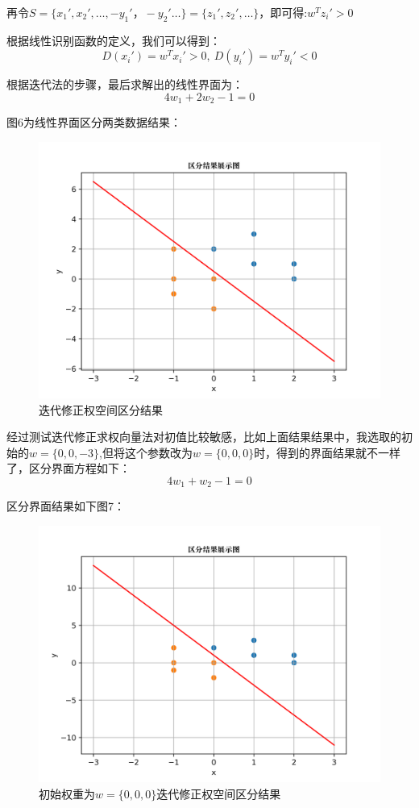 \documentclass{article}
\newcommand{\hs}{\hspace{2em}}
\begin{document}
再令$S=\{x_1',x_2',\dots,-y_1'，-y_2'\dots\}=\{z_1',z_2',\dots\}$，即可得:$w^Tz_i '>0$ 

{}

\hs 根据线性识别函数的定义，我们可以得到：
\begin{equation*}
D(x_i')=w^Tx_i'>0, ~D(y_i')=w^Ty_i'<0
\end{equation*}


{}


\hs 根据迭代法的步骤，最后求解出的线性界面为：
\begin{equation*}
4w_1+2w_2-1=0
\end{equation*}
       
{}       

\hs 图6为线性界面区分两类数据结果：

\begin{figure}[htbp]
	\centering
	\includegraphics[width=0.5\linewidth]{img//fig1.png}
	\caption{迭代修正权空间区分结果}
\end{figure}

{}

\hs 经过测试迭代修正求权向量法对初值比较敏感，比如上面结果结果中，我选取的初始的$w=\{0,0,-3\}$,但将这个参数改为$w=\{0,0,0\}$时，得到的界面结果就不一样了，区分界面方程如下：
\begin{equation*}
4w_1+w_2-1=0
\end{equation*}

区分界面结果如下图7：
   
   \begin{figure}[htbp]
   	\centering
   	\includegraphics[width=0.5\linewidth]{img//fig6.png}
   	\caption{初始权重为$w=\{0,0,0\}$迭代修正权空间区分结果}
   \end{figure}
    
\end{document}

